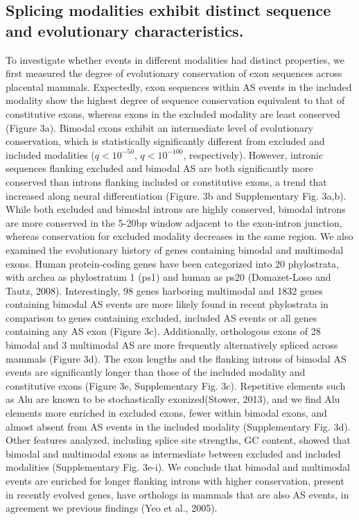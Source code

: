 \subsection{Splicing modalities exhibit distinct sequence and evolutionary characteristics.}

To investigate whether events in different modalities had distinct properties, we first measured the degree of evolutionary conservation of exon sequences across placental mammals. Expectedly, exon sequences within AS events in the included modality show the highest degree of sequence conservation equivalent to that of constitutive exons, whereas exons in the excluded modality are least conserved (Figure 3a). Bimodal exons exhibit an intermediate level of evolutionary conservation, which is statistically significantly different from excluded and included modalities ($q < 10^{-50}$, $q < 10^{-100}$, respectively). However, intronic sequences flanking excluded and bimodal AS are both significantly more conserved than introns flanking included or constitutive exons, a trend that increased along neural differentiation (Figure. 3b and Supplementary Fig. 3a,b). While both excluded and bimodal introns are highly conserved, bimodal introns are more conserved in the 5-20bp window adjacent to the exon-intron junction, whereas conservation for excluded modality decreases in the same region. We also examined the evolutionary history of genes containing bimodal and multimodal exons. Human protein-coding genes have been categorized into 20 phylostrata, with archea as phylostratum 1 (ps1) and human as ps20 (Domazet-Loso and Tautz, 2008). Interestingly, 98 genes harboring multimodal and 1832 genes containing bimodal AS events are more likely found in recent phylostrata in comparison to genes containing excluded, included AS events or all genes containing any AS exon (Figure 3c). Additionally, orthologous exons of 28 bimodal and 3 multimodal AS are more frequently alternatively spliced across mammals (Figure 3d). The exon lengths and the flanking introns of bimodal AS events are significantly longer than those of the included modality and constitutive exons (Figure 3e, Supplementary Fig. 3c). Repetitive elements such as Alu are known to be stochastically exonized(Stower, 2013), and we find Alu elements more enriched in excluded exons, fewer within bimodal exons, and almost absent from AS events in the included modality (Supplementary Fig. 3d). Other features analyzed, including splice site strengths, GC content, showed that bimodal and multimodal exons as intermediate between excluded and included modalities (Supplementary Fig. 3e-i). We conclude that bimodal and multimodal events are enriched for longer flanking introns with higher conservation, present in recently evolved genes, have orthologs in mammals that are also AS events, in agreement we previous findings (Yeo et al., 2005).

